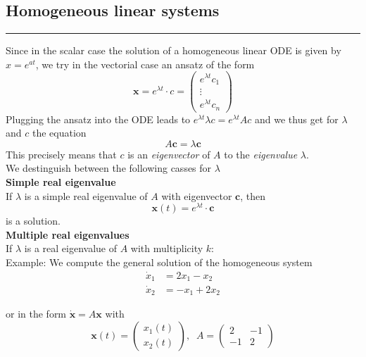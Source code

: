 \subsection{Homogeneous linear systems}
\noindent\rule[\linienAbstand]{\linewidth}{\linienDicke}
Since in the scalar case the solution of a homogeneous linear ODE is given by $x = e^{at}$, we try in the vectorial case an ansatz of the form
\begin{equation}
  \mathbf{x} = e^{\lambda t} \cdot c =
  \begin{pmatrix}
    e^{\lambda t}c_1\\
    \vdots\\
    e^{\lambda t}c_n
  \end{pmatrix}
\end{equation}
Plugging the ansatz into the ODE leads to $e^{\lambda t}\lambda c = e^{\lambda t} Ac$ and we thus get for $\lambda$ and $c$ the equation
\begin{equation}
  A\mathbf{c} = \lambda \mathbf{c}
\end{equation}
This precisely means that $c$ is an \emph{eigenvector} of $A$ to the \emph{eigenvalue} $\lambda$.\\

We destinguish between the following casses for $\lambda$\\
\textbf{Simple real eigenvalue}\\
If $\lambda$ is a simple real eigenvalue of $A$ with eigenvector $\mathbf{c}$, then
\begin{equation}
  \mathbf{x}(t) = e^{\lambda t} \cdot \mathbf{c}
\end{equation}
is a solution.\\

\textbf{Multiple real eigenvalues}\\
If $\lambda$ is a real eigenvalue of $A$ with multiplicity $k$:\\

Example: We compute the general solution of the homogeneous system
\begin{equation}
  \begin{split}
    \dot{x}_1 &= 2x_1 - x_2\\
    \dot{x}_2 &= -x_1 + 2x_2
  \end{split}
\end{equation}

or in the form $\dot{\mathbf{x}} = A\mathbf{x}$ with
\begin{equation}
  \mathbf{x}(t) = \begin{pmatrix}
    x_1(t)\\
    x_2(t)
  \end{pmatrix}
  , \;\; A = \begin{pmatrix}
      2 & -1\\
      -1 & 2
  \end{pmatrix}
\end{equation}

